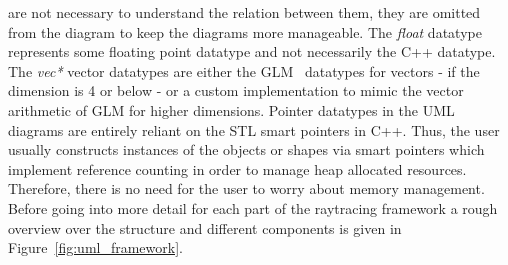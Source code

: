 \documentclass[a4paper,10pt]{article}
\newcommand{\figref}[1]{Figure~\ref{#1}}
\begin{document}
    are not necessary to understand the relation between them,
    they are omitted from the diagram to keep the diagrams more
    manageable.
    The \emph{float} datatype represents some floating point datatype
    and not necessarily the C++ datatype.
    The \emph{vec*} vector datatypes are either the GLM~\cite{glm} datatypes
    for vectors - if the dimension is 4 or below - or a custom implementation
    to mimic the vector arithmetic of GLM for higher dimensions.
    Pointer datatypes in the UML diagrams are entirely reliant on
    the STL smart pointers in C++.
    Thus, the user usually constructs instances of the objects or shapes
    via smart pointers which implement reference counting
    in order to manage heap allocated resources.
    Therefore, there is no need for the user to worry about 
    memory management. 
    Before going into more detail for each part of the raytracing
    framework a rough overview over the structure and different
    components is given in \figref{fig:uml_framework}.
    
\end{document}
